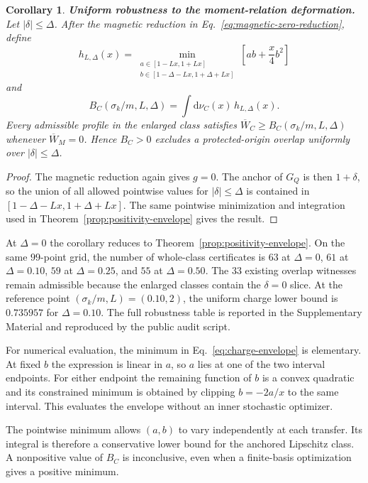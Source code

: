 \documentclass[12pt]{iopjournal}
\newcommand{\dd}{\mathrm d}
\newtheorem{corollary}{Corollary}[section]
\theoremstyle{definition}
\theoremstyle{remark}
\begin{document}
\begin{corollary}
\textbf{Uniform robustness to the moment-relation deformation.}
\label{cor:delta-robustness}
Let $|\delta|\le\Delta$. After the magnetic reduction in Eq.~\eqref{eq:magnetic-zero-reduction}, define
\begin{equation}
h_{L,\Delta}(x)=
\min_{\substack{a\in[1-Lx,1+Lx]\\
b\in[1-\Delta-Lx,1+\Delta+Lx]}}
\left[ab+\frac{x}{4}b^2\right]
\label{eq:charge-envelope-delta}
\end{equation}
and
\begin{equation}
B_C(\sigma_k/m,L,\Delta)=\int\dd\nu_C(x)\,h_{L,\Delta}(x).
\label{eq:BC-delta}
\end{equation}
Every admissible profile in the enlarged class satisfies $\overline W_C\ge B_C(\sigma_k/m,L,\Delta)$ whenever $\overline W_M=0$. Hence $B_C>0$ excludes a protected-origin overlap uniformly over $|\delta|\le\Delta$.
\end{corollary}
\begin{proof}
The magnetic reduction again gives $g=0$. The anchor of $G_Q$ is then $1+\delta$, so the union of all allowed pointwise values for $|\delta|\le\Delta$ is contained in $[1-\Delta-Lx,1+\Delta+Lx]$. The same pointwise minimization and integration used in Theorem~\ref{prop:positivity-envelope} gives the result.
\end{proof}

At $\Delta=0$ the corollary reduces to Theorem~\ref{prop:positivity-envelope}. On the same $99$-point grid, the number of whole-class certificates is $63$ at $\Delta=0$, $61$ at $\Delta=0.10$, $59$ at $\Delta=0.25$, and $55$ at $\Delta=0.50$. The $33$ existing overlap witnesses remain admissible because the enlarged classes contain the $\delta=0$ slice. At the reference point $(\sigma_k/m,L)=(0.10,2)$, the uniform charge lower bound is $0.735957$ for $\Delta=0.10$. The full robustness table is reported in the Supplementary Material and reproduced by the public audit script.

For numerical evaluation, the minimum in Eq.~\eqref{eq:charge-envelope} is elementary. At fixed $b$ the expression is linear in $a$, so $a$ lies at one of the two interval endpoints. For either endpoint the remaining function of $b$ is a convex quadratic and its constrained minimum is obtained by clipping $b=-2a/x$ to the same interval. This evaluates the envelope without an inner stochastic optimizer.

The pointwise minimum allows $(a,b)$ to vary independently at each transfer. Its integral is therefore a conservative lower bound for the anchored Lipschitz class. A nonpositive value of $B_C$ is inconclusive, even when a finite-basis optimization gives a positive minimum.
\end{document}
